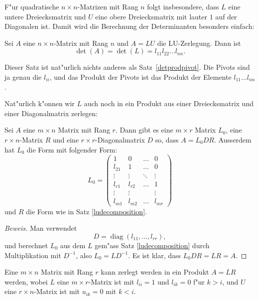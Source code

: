 F"ur quadratische $n\times n$-Matrizen mit Rang $n$ folgt insbesondere,
dass $L$ eine untere Dreiecksmatrix und $U$ eine obere Dreiecksmatrix
mit lauter $1$ auf der Diagonalen ist.
Damit wird die Berechnung der
Determinanten besonders einfach:

\begin{satz}
Sei $A$ eine $n\times n$-Matrix mit Rang $n$ und $A=LU$ die LU-Zerlegung.
Dann ist
\[
\det(A)=\det(L)=l_{11}l_{22}\dots l_{nn}.
\]
\end{satz}

Dieser Satz ist nat"urlich nichts anderes als Satz~\ref{detprodpivot}.
Die Pivots sind ja genau die $l_{ii}$, und 
das Produkt der Pivots ist das Produkt der Elemente
$l_{11}\dots l_{nn}$.

Nat"urlich k"onnen wir $L$ auch noch in ein Produkt aus einer
Dreiecksmatrix und einer Diagonalmatrix zerlegen:

\begin{satz}
\label{ldrdecomposition}
Sei $A$ eine $m\times n$ Matrix mit Rang $r$.
Dann gibt es eine $m\times r$ Matrix $L_0$, eine $r\times n$-Matrix $R$
und eine $r\times r$-Diagonalmatrix $D$
so, dass $A=L_0DR$.
Ausserdem hat $L_0$ die Form mit folgender Form:
\[
L_0=\begin{pmatrix}
1     &0&\dots&0\\
l_{21}&1     &\dots&0\\
\vdots&\vdots&\ddots&\vdots\\
l_{r1}&l_{r2}&\dots&1     \\
\vdots&\vdots& &\vdots\\
l_{m1}&l_{m2}&\dots&l_{mr}
\end{pmatrix}
\]
und $R$ die Form wie in Satz \ref{ludecomposition}.
\end{satz}

\begin{proof}[Beweis]
Man verwendet 
\[
D=\operatorname{diag}(l_{11},\dots,l_{rr}),
\]
und berechnet $L_0$ aus dem $L$ gem"ass Satz \ref{ludecomposition} durch
Multiplikation mit $D^{-1}$, also $L_0=LD^{-1}$.
Es ist klar, dass
$L_0DR=LR=A$.
\end{proof}

\begin{satz}[LR-Zerlegung]
Eine $m\times n$ Matrix mit Rang $r$ kann zerlegt werden in ein Produkt $A=LR$
werden, wobei $L$ eine $m\times r$-Matrix ist mit $l_{ii}=1$ und $l_{ik}=0$
f"ur $k>i$, und $U$ eine $r\times n$-Matrix ist mit $u_{ik}=0$ mit $k<i$.
\end{satz}

